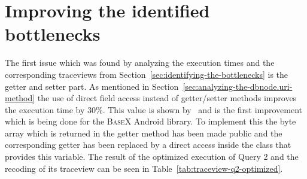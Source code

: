 %
%
%

\section{Improving the identified bottlenecks}
\label{sec:improving}
The first issue which was found by analyzing the execution times and the corresponding traceviews from Section~\ref{sec:identifying-the-bottlenecks} is the getter and setter part.
As mentioned in Section~\ref{sec:analyzing-the-dbnode.uri-method} the use of direct field access instead of getter/setter methods improves the execution time by 30\%.
This value is shown by~\cite{toninievlautatingandroid} and is the first improvement which is being done for the \textsc{BaseX} Android library.
To implement this the byte array which is returned in the getter method has been made public and the corresponding getter has been replaced by a direct access inside the class that provides this variable.
The result of the optimized execution of Query 2 and the recoding of its traceview can be seen in Table~\ref{tab:traceview-q2-optimized}.


